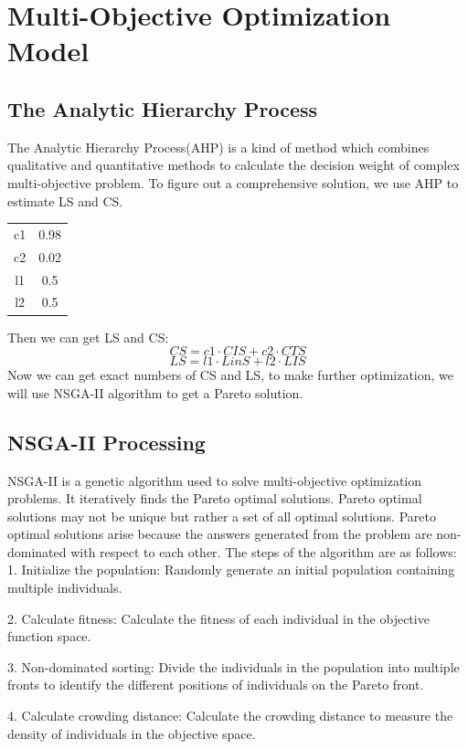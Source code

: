 \documentclass[12pt]{article}  %
\begin{document}
 \section{Multi-Objective Optimization Model}
 \subsection{The Analytic Hierarchy Process}
 The Analytic Hierarchy Process(AHP) is a kind of method which combines qualitative and quantitative methods to calculate the decision weight of complex multi-objective problem. To figure out a comprehensive solution, we use AHP to estimate LS and CS.
 \begin{table}[H]
    \begin{center}
    \begin{tabular}{c|c}
    c1 & 0.98 \\
    c2 & 0.02 \\
    l1 & 0.5  \\
    l2 & 0.5 \\
    \end{tabular}
\end{center}
    \end{table}
    Then we can get LS and CS:\\
$$CS=c1\cdot CIS+c2\cdot CTS$$
$$LS=l1\cdot LinS+l2\cdot LIS$$
Now we can get exact numbers of CS and LS, to make further optimization, we will use NSGA-II algorithm to get a Pareto solution.
 \subsection{NSGA-II Processing}
 NSGA-II is a genetic algorithm used to solve multi-objective optimization problems. It iteratively finds the Pareto optimal solutions. Pareto optimal solutions may not be unique but rather a set of all optimal solutions. Pareto optimal solutions arise because the answers generated from the problem are non-dominated with respect to each other.
The steps of the algorithm are as follows:
1. Initialize the population: Randomly generate an initial population containing multiple individuals.

2. Calculate fitness: Calculate the fitness of each individual in the objective function space.

3. Non-dominated sorting: Divide the individuals in the population into multiple fronts to identify the different positions of individuals on the Pareto front.

4. Calculate crowding distance: Calculate the crowding distance to measure the density of individuals in the objective space.
\end{document}
